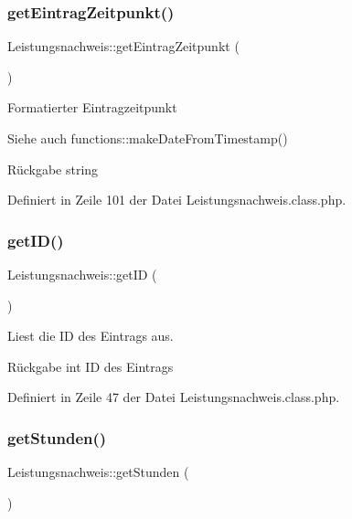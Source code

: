 \subsubsection{\texorpdfstring{get\+Eintrag\+Zeitpunkt()}{getEintragZeitpunkt()}}
{\footnotesize\ttfamily Leistungsnachweis\+::get\+Eintrag\+Zeitpunkt (\begin{DoxyParamCaption}{ }\end{DoxyParamCaption})}

Formatierter Eintragzeitpunkt \begin{DoxySeeAlso}{Siehe auch}
functions\+::make\+Date\+From\+Timestamp() 
\end{DoxySeeAlso}
\begin{DoxyReturn}{Rückgabe}
string 
\end{DoxyReturn}


Definiert in Zeile 101 der Datei Leistungsnachweis.\+class.\+php.

\mbox{\label{class_leistungsnachweis_a645d58d081ba77e6e883e3089853b378}} 
\subsubsection{\texorpdfstring{get\+I\+D()}{getID()}}
{\footnotesize\ttfamily Leistungsnachweis\+::get\+ID (\begin{DoxyParamCaption}{ }\end{DoxyParamCaption})}

Liest die ID des Eintrags aus. \begin{DoxyReturn}{Rückgabe}
int ID des Eintrags 
\end{DoxyReturn}


Definiert in Zeile 47 der Datei Leistungsnachweis.\+class.\+php.

\mbox{\label{class_leistungsnachweis_affea613a23892da3b5c1cbef16eae7dc}} 
\subsubsection{\texorpdfstring{get\+Stunden()}{getStunden()}}
{\footnotesize\ttfamily Leistungsnachweis\+::get\+Stunden (\begin{DoxyParamCaption}{ }\end{DoxyParamCaption})}

